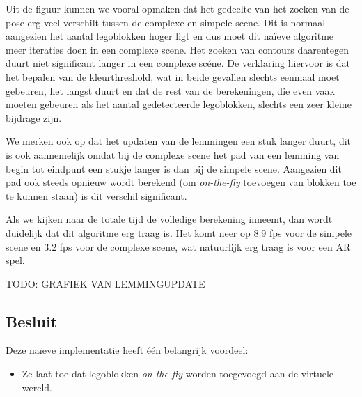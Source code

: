 Uit de figuur kunnen we vooral opmaken dat het gedeelte van het zoeken van de pose erg veel verschilt tussen de complexe en simpele scene. Dit is normaal aangezien het aantal legoblokken hoger ligt en dus moet dit na\"ieve algoritme meer iteraties doen in een complexe scene. Het zoeken van contours daarentegen duurt niet significant langer in een complexe sc\'ene. De verklaring hiervoor is dat het bepalen van de kleurthreshold, wat in beide gevallen slechts eenmaal moet gebeuren, het langst duurt en dat de rest van de berekeningen, die even vaak moeten gebeuren als het aantal gedetecteerde legoblokken, slechts een zeer kleine bijdrage zijn. 

We merken ook op dat het updaten van de lemmingen een stuk langer duurt, dit is ook aannemelijk omdat bij de complexe scene het pad van een lemming van begin tot eindpunt een stukje langer is dan bij de simpele scene. Aangezien dit pad ook steeds opnieuw wordt berekend (om \textit{on-the-fly} toevoegen van blokken toe te kunnen staan) is dit verschil significant.

Als we kijken naar de totale tijd de volledige berekening inneemt, dan wordt duidelijk dat dit algoritme erg traag is. Het komt neer op 8.9 fps voor de simpele scene en 3.2 fps voor de complexe scene, wat natuurlijk erg traag is voor een AR spel.

TODO: GRAFIEK VAN LEMMINGUPDATE %

\subsection{Besluit}
Deze na\"ieve implementatie heeft \'e\'en belangrijk voordeel:
\begin{itemize}
\item Ze laat toe dat legoblokken \textit{on-the-fly} worden toegevoegd aan de virtuele wereld.
\end{itemize}

